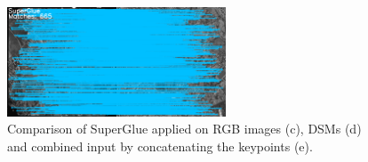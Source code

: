\begin{figure}[htbp]
\begin{center}
{\begin{minipage}[t]{0.48\linewidth}
				\centering
				\includegraphics[width=6.5cm]{images/Chapitre5/CatRes.png}
			\end{minipage}%
		}
		\caption{Comparison of SuperGlue applied on RGB images (c), \ac{DSM}s (d) and combined input by concatenating the keypoints (e). }
		\label{RGBDSM}
	\end{center}
\end{figure} 

